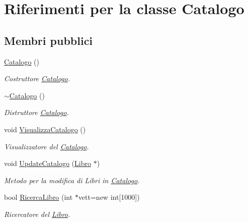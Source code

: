 \hypertarget{class_catalogo}{}\section{Riferimenti per la classe Catalogo}
\label{class_catalogo}
\subsection*{Membri pubblici}
\begin{DoxyCompactItemize}
\item 
\mbox{\hyperlink{class_catalogo_af2d231942828cd6e47bdb17f4215d5d6}{Catalogo}} ()
\begin{DoxyCompactList}\small\item\em Costruttore \mbox{\hyperlink{class_catalogo}{Catalogo}}. \end{DoxyCompactList}\item 
\mbox{\label{class_catalogo_af1b86a93a832982c779e34b5ce9dd88b}} 
\mbox{\hyperlink{class_catalogo_af1b86a93a832982c779e34b5ce9dd88b}{$\sim$\+Catalogo}} ()
\begin{DoxyCompactList}\small\item\em Distruttore \mbox{\hyperlink{class_catalogo}{Catalogo}}. \end{DoxyCompactList}\item 
void \mbox{\hyperlink{class_catalogo_a1ba3cde9c46e9d8f5bf6654c7b96647f}{Visualizza\+Catalogo}} ()
\begin{DoxyCompactList}\small\item\em Visualizzatore del \mbox{\hyperlink{class_catalogo}{Catalogo}}. \end{DoxyCompactList}\item 
\mbox{\label{class_catalogo_aeaae558ee214dc61944b0a145932fd44}} 
void \mbox{\hyperlink{class_catalogo_aeaae558ee214dc61944b0a145932fd44}{Update\+Catalogo}} (\mbox{\hyperlink{class_libro}{Libro}} $\ast$)
\begin{DoxyCompactList}\small\item\em Metodo per la modifica di Libri in \mbox{\hyperlink{class_catalogo}{Catalogo}}. \end{DoxyCompactList}\item 
bool \mbox{\hyperlink{class_catalogo_a378e5b182d45ccfba3ace696656cb1d0}{Ricerca\+Libro}} (int $\ast$vett=new int\mbox{[}1000\mbox{]})
\begin{DoxyCompactList}\small\item\em Ricercatore del \mbox{\hyperlink{class_libro}{Libro}}. \end{DoxyCompactList}\end{DoxyCompactItemize}


